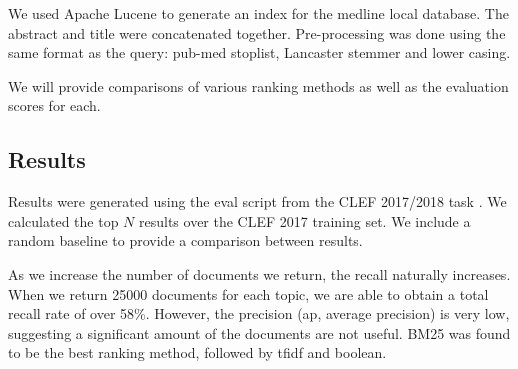 We used Apache Lucene to generate an index for the medline local database. The abstract and title were concatenated together. Pre-processing was done using the same format as the query: pub-med stoplist, Lancaster stemmer and lower casing. 

We will provide comparisons of various ranking methods as well as the evaluation scores for each. 

\subsection{Results}

Results were generated using the eval script from the CLEF 2017/2018 task \cite{Kanoulas12017}. We calculated the top $N$ results over the CLEF 2017 training set. We include a random baseline  to provide a comparison between results.


\begin{table}[H]
\caption{Results for IR medline system. Comparison for both 5000 and 25000 thresholds}
\end{table}


As we increase the number of documents we return, the recall naturally increases. When we return 25000 documents for each topic, we are able to obtain a total recall rate of over 58\%. However, the precision (ap, average precision) is very low, suggesting a significant amount of the documents are not useful. BM25 was found to be the best ranking method, followed by tfidf and boolean.


